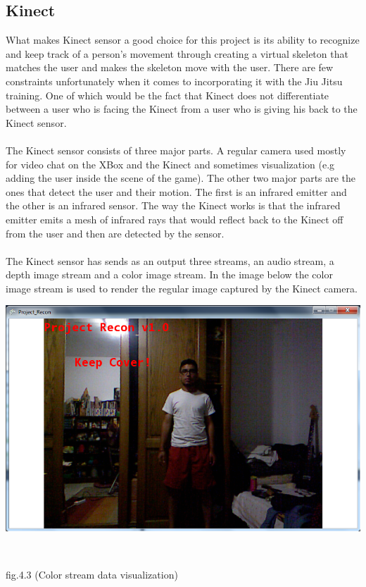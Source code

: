 \subsection{Kinect}
What makes Kinect sensor a good choice for this project is its ability to recognize and keep track of a person's movement through creating a virtual skeleton that matches the user and makes the skeleton move with the user. There are few constraints unfortunately when it comes to incorporating it with the Jiu Jitsu training. One of which would be the fact that Kinect does not differentiate between a user who is facing the Kinect from a user who is giving his back to the Kinect sensor.
\\
\\
The Kinect sensor consists of three major parts. A regular camera used mostly for video chat on the XBox and the Kinect and sometimes visualization (e.g adding the user inside the scene of the game). The other two major parts are the ones that detect the user and their motion. The first is an infrared emitter and the other is an infrared sensor. The way the Kinect works is that the infrared emitter emits a mesh of infrared rays that would reflect back to the Kinect off from the user and then are detected by the sensor.
\\
\\
The Kinect sensor has sends as an output three streams, an audio stream, a depth image stream and a color image stream. In the image below the color image stream is used to render the regular image captured by the Kinect camera.
\\
\centerline{\includegraphics[scale=0.5]{color_data.png}}
\\
\centerline{fig.4.3 (Color stream data visualization)}
\\
